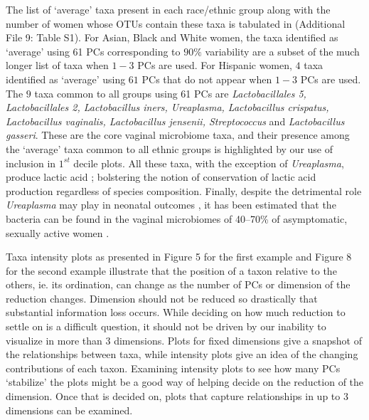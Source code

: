 \documentclass[doublespacing]{bmcart}
\begin{document}
The list of `average' taxa present in each race/ethnic group along with the number of women whose OTUs contain these taxa is tabulated in (Additional File 9: Table S1). For Asian, Black and White women, the taxa identified as `average' using 61 PCs corresponding to $90\%$ variability are a subset of the much longer list of taxa when $1-3$ PCs are used. For Hispanic women, $4$ taxa identified as `average' using $61$ PCs that do not appear when $1-3$ PCs are used. The $9$ taxa common to all groups using 61 PCs are  {\it Lactobacillales 5, Lactobacillales 2, Lactobacillus iners, Ureaplasma, Lactobacillus crispatus, Lactobacillus vaginalis,  Lactobacillus jensenii, Streptococcus} and {\it Lactobacillus gasseri}.  These are the core vaginal microbiome taxa, and their presence among the `average' taxa common to all ethnic groups is highlighted by our use of inclusion in $1^{st}$ decile plots. All these taxa, with the exception of \textit{Ureaplasma}, produce lactic acid \cite{Ravel}; bolstering the notion of conservation of lactic acid production regardless of species composition. Finally, despite the detrimental role \textit{Ureaplasma} may play in neonatal outcomes \cite{fettweis2014differences}, it has been estimated that the bacteria can be found in the vaginal microbiomes of 40--70\% of asymptomatic, sexually active women \cite{remington2011infectious}.

Taxa intensity plots as presented in Figure 5 for the first example and Figure 8 for the second example illustrate that the position of a taxon relative to the others, ie. its ordination, can change as the number of PCs or dimension of the reduction changes.  Dimension should not be reduced so drastically that substantial information loss occurs. While deciding on how much reduction to settle on is a difficult question, it should not be driven by our inability to visualize in more than 3 dimensions. Plots for fixed dimensions give a snapshot of the relationships between taxa, while intensity plots give an idea of the changing contributions of each taxon. Examining intensity plots to see how many PCs `stabilize' the plots might be a good way of helping decide on the reduction of the dimension. Once that is decided on, plots that capture relationships in up to 3 dimensions can be examined. 
\end{document}
